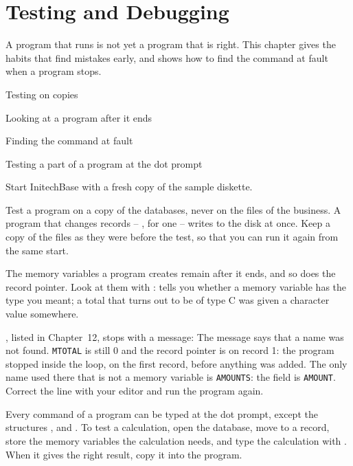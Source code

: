 \chapter{Testing and Debugging}
A program that runs is not yet a program that is right.  This chapter gives the
habits that find mistakes early, and shows how to find the command at fault
when a program stops.

\begin{ChapterCovers}
\item Testing on copies
\item Looking at a program after it ends
\item Finding the command at fault
\item Testing a part of a program at the dot prompt
\end{ChapterCovers}

Start InitechBase with a fresh copy of the sample diskette.

Test a program on a copy of the databases, never on the files of the business.
A program that changes records -- , for one -- writes to the disk
at once.  Keep a copy of the files as they were before the test, so that you can
run it again from the same start.

The memory variables a program creates remain after it ends, and so does the
record pointer.  Look at them with :
 tells you whether a memory variable has the type you meant; a total
that turns out to be of type C was given a character value somewhere.

, listed in Chapter~12, stops with a message:
The message says that a name was not found.  \texttt{MTOTAL} is still 0 and the
record pointer is on record 1: the program stopped inside the loop, on the
first record, before anything was added.  The only name used there that is not
a memory variable is \texttt{AMOUNTS}: the field is \texttt{AMOUNT}.  Correct the
line with your editor and run the program again.

Every command of a program can be typed at the dot prompt, except the
structures ,  and .  To test a calculation,
open the database, move to a record, store the memory variables the
calculation needs, and type the calculation with .  When it gives the
right result, copy it into the program.

